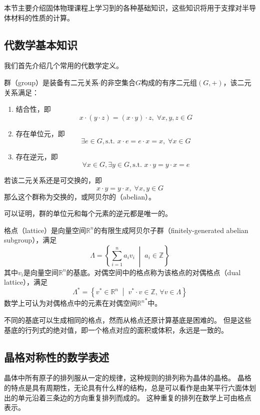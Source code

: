 
本节主要介绍固体物理课程上学习到的各种基础知识，这些知识将用于支撑对半导体材料的性质的计算。

\subsection{代数学基本知识}

我们首先介绍几个常用的代数学定义。

\begin{definition}
    群（group）是装备有二元关系$\cdot$的非空集合$G$构成的有序二元组$(G, +)$，该二元关系满足：
    \begin{enumerate}[nosep]
        \item 结合性，即
            $$x\cdot ( y \cdot z) = (x \cdot y) \cdot z, \; \forall x,y,z \in G$$
        \item 存在单位元，即
            $$\exists e \in G, \text{s.t. } x \cdot e = e\cdot x = x, \; \forall x \in G$$
        \item 存在逆元，即
            $$\forall x \in G, \exists y \in G, \text{s.t. } x \cdot y = y \cdot x = e$$
    \end{enumerate}
    若该二元关系还是可交换的，即
    $$x \cdot y = y \cdot x, \; \forall x, y \in G$$
    那么这个群称为交换的，或阿贝尔的（abelian）。
\end{definition}

可以证明，群的单位元和每个元素的逆元都是唯一的。

\begin{definition}
    格点（lattice）是向量空间$\mathbb R^n$的有限生成阿贝尔子群（finitely-generated abelian subgroup），满足
    $$\Lambda = \left\{ \sum_{i=1}^n a_i v_i \; \middle\vert\; a_i \in \mathbb Z \right\}$$
    其中$v_i$是向量空间$\mathbb R^n$的基底。对偶空间中的格点称为该格点的对偶格点（dual lattice），满足
    $$\Lambda^* = \left\{ v^* \in \mathbb R^n \; \middle\vert \; v^* \cdot v \in \mathbb Z ,\, \forall v \in \Lambda \right\}$$
    数学上可认为对偶格点中的元素在对偶空间${{\mathbb{R}}^n}^*$中。
\end{definition}

不同的基底可以生成相同的格点，然而从格点还原计算基底是困难的。
但是这些基底的行列式的绝对值，即一个格点对应的面积或体积，永远是一致的。

\subsection{晶格对称性的数学表述}

晶体中所有原子的排列服从一定的规律，这种规则的排列称为晶体的晶格。
晶格的特点是具有周期性，无论具有什么样的结构，总是可以看作是由某平行六面体划出的单元沿着三条边的方向重复排列而成的。
这种重复的排列在数学上可由格点表示。

